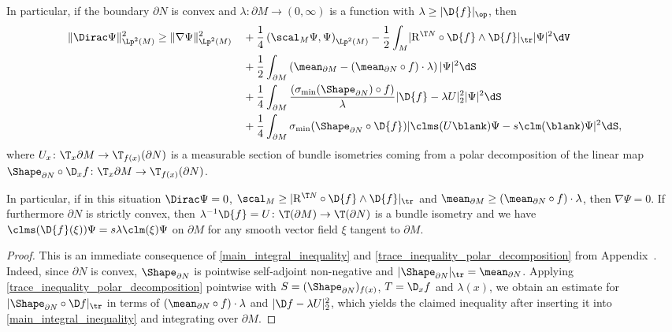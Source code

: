 \documentclass[a4paper,11pt]{amsart}
\numberwithin{equation}{section}
\begin{document}
	\begin{corollary} \label{boundary_rigidity}
	        In particular, if the boundary \(\partial N\) is convex and \(\lambda \colon \partial M \to (0,\infty)\) is a function with \(\lambda \geq \lvert \D{f} \rvert_{\op}\), then
	    \begin{alignat*}{2}
	        \| \Dirac \Psi \|_{\Lp^2(M)}^2 &\geq \| \nabla \Psi \|_{\Lp^2(M)}^2 &&+ \frac{1}{4} \left(\scal_M \Psi, \Psi\right)_{\Lp^2(M)} - \frac{1}{2}\int_M \lvert \mathrm{R}^{\T N} \circ \D{f} \wedge \D{f} \rvert_{\tr} \lvert \Psi \rvert^2 \dV \\
	    & &&+ \frac{1}{2} \int_{\partial M}  \left(\mean_{\partial M} - (\mean_{\partial N} \circ f) \cdot \lambda  \right) |\Psi|^2 \dS \\
	    & &&+ \frac{1}{4} \int_{\partial M}  \frac{(\sigma_{\min}(\Shape_{\partial N})\circ f)}{\lambda} \lvert \D{f} - \lambda U \rvert_2^2 |\Psi|^2 \dS \\
	    & &&+ \frac{1}{4} \int_{\partial M}  \sigma_{\min}(\Shape_{\partial N} \circ \D{f}) \lvert \clms(U \blank) \Psi - s \clm(\blank) \Psi\rvert^2 \dS,
	\end{alignat*}
	where \(U_x \colon \T_{x} \partial M \to \T_{f(x)}(\partial N)\) is a measurable section of bundle isometries coming from a polar decomposition  of the linear map \(\Shape_{\partial N} \circ \D_x f \colon \T_{x} \partial M \to \T_{f(x)}(\partial N)\).

	In particular, if in this situation \(\Dirac \Psi = 0\), \(\scal_M \geq  \lvert \mathrm{R}^{\T N} \circ \D{f} \wedge \D{f} \rvert_{\tr}\) and \(\mean _{\partial M} \geq (\mean_{\partial N} \circ f) \cdot \lambda\), then \(\nabla \Psi = 0\).
	If furthermore \(\partial N\) is strictly convex, then \(\lambda^{-1} \D{f} = U \colon \T (\partial M) \to \T(\partial N)\) is a bundle isometry and we have \(\clms(\D{f}(\xi)) \Psi = s \lambda \clm(\xi) \Psi\) on \(\partial M\) for any smooth vector field \(\xi\) tangent to \(\partial M\).
	 \end{corollary}
	 \begin{proof}
	     This is an immediate consequence of \cref{main_integral_inequality} and \cref{trace_inequality_polar_decomposition} from Appendix~.
	     Indeed, since \(\partial N\) is convex, \(\Shape_{\partial N}\) is pointwise self-adjoint non-negative and \(|\Shape_{\partial N}|_{\tr} = \mean_{\partial N}\).
	     Applying \cref{trace_inequality_polar_decomposition} pointwise with \(S = (\Shape_{\partial N})_{f(x)}\), \(T = \D_x f\) and \(\lambda(x)\), we obtain an estimate for \(|\Shape_{\partial N} \circ \D f|_{\tr}\) in terms of \((\mean_{\partial N}\circ f)\cdot \lambda\) and \(\lvert \D f - \lambda U\rvert_2^2\), which yields the claimed inequality after inserting it into \cref{main_integral_inequality} and integrating over \(\partial M\).
	 \end{proof}
	 
\end{document}
